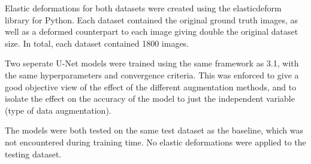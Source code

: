 Elastic deformations for both datasets were created using the elasticdeform
library for Python. Each dataset contained the original ground truth images, as well
as a deformed counterpart to each image giving double the original dataset size. In total,
each dataset contained 1800 images. \newline

Two seperate U-Net models were trained using the same framework as 3.1, with the
same hyperparameters and convergence criteria. This was enforced to give a good
objective view of the effect of the different augmentation methods, and to
isolate the effect on the accuracy of the model to just the independent variable
(type of data augmentation). \newline

The models were both tested on the same test dataset as the baseline, which was
not encountered during training time. No elastic deformations were applied to
the testing dataset. 